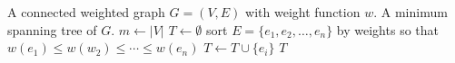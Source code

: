 
\begin{algorithmic}[1]
\Require A connected weighted graph $G = (V,E)$ with weight function $w$.
\Ensure A minimum spanning tree of $G$.
\State $m \gets |V|$
\State $T \gets \emptyset$
\State sort $E = \{e_1, e_2, \dots, e_n\}$ by weights so that $w(e_1) \leq w(w_2) \leq \cdots \leq w(e_n)$
    \State $T \gets T \cup \{e_i\}$
  \EndIf
    \State \Return $T$
  \EndIf
\EndFor
\end{algorithmic}
